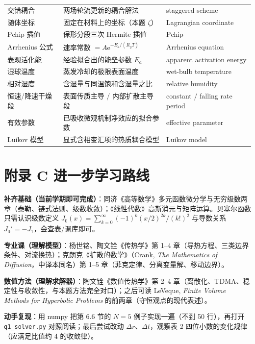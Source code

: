 \documentclass[12pt,a4paper]{ctexart}
\begin{document}
\begin{center}
{\begin{tabular}{lll}
交错耦合 & 两场轮流更新的耦合解法 & staggered scheme \\
随体坐标 & 固定在材料上的坐标（本题 $\zeta$） & Lagrangian coordinate \\
Pchip 插值 & 保形分段三次 Hermite 插值 & Pchip \\
Arrhenius 公式 & 速率常数 $=A\mathrm{e}^{-E_a/(R_gT)}$ & Arrhenius equation \\
表观活化能 & 经验拟合出的能垒参数 $E_a$ & apparent activation energy \\
湿球温度 & 蒸发冷却的极限表面温度 & wet-bulb temperature \\
相对湿度 & 含湿量与同温饱和含湿量之比 & relative humidity \\
恒速/降速干燥段 & 表面传质主导 / 内部扩散主导段 & constant / falling rate period \\
有效参数 & 已吸收微观机制净效应的拟合参数 & effective parameter \\
Luikov 模型 & 显式含相变汇项的热质耦合模型 & Luikov model \\
\bottomrule
\end{tabular}}
\end{center}

\section{附录 C 进一步学习路线}

\textbf{补齐基础（当前学期即可完成）}：同济《高等数学》多元函数微分学与无穷级数两章（泰勒、链式法则、级数收敛）；《线性代数》高斯消元与矩阵运算。贝塞尔函数只需认识级数定义 $J_0(x)=\sum_{k=0}^\infty(-1)^k(x/2)^{2k}/(k!)^2$ 与导数关系 $J_0'=-J_1$，会查表/调库即可。

\textbf{专业课（理解模型）}：杨世铭、陶文铨《传热学》第 1--4 章（导热方程、三类边界条件、对流换热）；克朗克《扩散的数学》（Crank, \emph{The Mathematics of Diffusion}，中译本同名）第 1--5 章（菲克定律、分离变量解、移动边界）。

\textbf{数值方法（理解求解器）}：陶文铨《数值传热学》第 2--4 章（离散化、TDMA、稳定性与收敛性，与本题方法完全对口）；之后可读 LeVeque, \emph{Finite Volume Methods for Hyperbolic Problems} 的前两章（守恒观点的现代表述）。

\textbf{动手复现}：用 numpy 把第 6.6 节的 $N=5$ 例子实现一遍（不到 50 行），再打开 \texttt{q1\_solver.py} 对照阅读；最后尝试改动 $\Delta r$、$\Delta t$，观察表 2 四位小数的变化规律（应满足比值约 4 的收敛律）。
\end{document}
